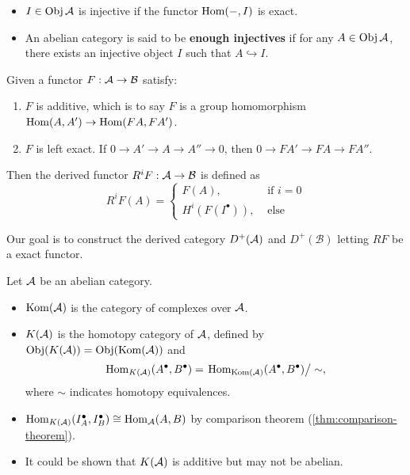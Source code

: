 \begin{definition} \hfill
  \begin{itemize}
    \item $I \in \operatorname{Obj} \mathcal{A}$ is injective if the functor $\operatorname{Hom}(-, I)$ is exact.
    \item An abelian category is said to be {\bf enough injectives} if
      for any $A \in \operatorname{Obj} \mathcal{A}$, there exists an injective object $I$ such that
      $A \hookrightarrow I$.
  \end{itemize}
\end{definition}

\begin{definition}
  Given a functor $F : \mathcal{A} \to \mathcal{B}$ satisfy:
  \begin{enumerate}
    \item $F$ is additive, which is to say $F$ is a group
      homomorphism $\operatorname{Hom}(A, A') \to \operatorname{Hom}(FA, FA')$.
    \item $F$ is left exact. If $0 \to A' \to A \to A'' \to 0$,
      then $0 \to FA' \to FA \to FA''$.
  \end{enumerate}
  Then the derived functor $R^i F : \mathcal{A} \to \mathcal{B}$ is defined as
  \[ R^i F(A) = \begin{cases}
      F(A), & \text{ if } i = 0 \\
      H^i(F(I^\bullet)), & \text{ else } \end{cases} \]
\end{definition}

Our goal is to construct the derived category $D^+(\mathcal{A})$ and $D^+(\mathcal{B})$
letting $RF$ be a exact functor.

\begin{definition}
  Let $\mathcal{A}$ be an abelian category.
  \begin{itemize}
    \item $\operatorname{Kom}(\mathcal{A})$ is the category of complexes over $\mathcal{A}$.
    \item $K(\mathcal{A})$ is the homotopy category of $\mathcal{A}$, defined by
      $\operatorname{Obj}(K(\mathcal{A})) = \operatorname{Obj}(\operatorname{Kom}(\mathcal{A}))$ and
      \[ \operatorname{Hom}_{K(\mathcal{A})}(A^\bullet, B^\bullet) = \left. \operatorname{Hom}_{\operatorname{Kom}(\mathcal{A})}(A^\bullet, B^\bullet) \right/ \sim, \]
      where $\sim$ indicates homotopy equivalences.
  \end{itemize}
\end{definition}

\begin{remark} \hfill
  \begin{itemize}
    \item $\operatorname{Hom}_{K(\mathcal{A})}(I^\bullet_A, I^\bullet_B) \cong \operatorname{Hom}_{\mathcal{A}}(A, B)$ by comparison theorem
      (\ref{thm:comparison-theorem}).
    \item It could be shown that $K(\mathcal{A})$ is additive but may not be abelian.
  \end{itemize}
\end{remark}

